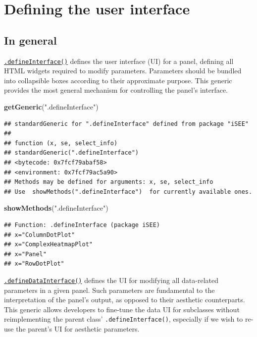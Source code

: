 \documentclass[
]{book}
\newenvironment{Shaded}{\begin{snugshade}}{\end{snugshade}}
\newcommand{\KeywordTok}[1]{\textcolor[rgb]{0.13,0.29,0.53}{\textbf{#1}}}
\newcommand{\NormalTok}[1]{#1}
\newcommand{\StringTok}[1]{\textcolor[rgb]{0.31,0.60,0.02}{#1}}
\begin{document}
\hypertarget{defining-the-user-interface}{%
\section{Defining the user interface}\label{defining-the-user-interface}}

\hypertarget{in-general}{%
\subsection{In general}\label{in-general}}

\href{https://isee.github.io/iSEE/reference/interface-generics.html}{\texttt{.defineInterface()}} defines the user interface (UI) for a panel, defining all HTML widgets required to modify parameters.
Parameters should be bundled into collapsible boxes according to their approximate purpose.
This generic provides the most general mechanism for controlling the panel's interface.

\begin{Shaded}
\begin{Highlighting}[]
\KeywordTok{getGeneric}\NormalTok{(}\StringTok{".defineInterface"}\NormalTok{)}
\end{Highlighting}
\end{Shaded}

\begin{verbatim}
## standardGeneric for ".defineInterface" defined from package "iSEE"
## 
## function (x, se, select_info) 
## standardGeneric(".defineInterface")
## <bytecode: 0x7fcf79abaf58>
## <environment: 0x7fcf79ac5a90>
## Methods may be defined for arguments: x, se, select_info
## Use  showMethods(".defineInterface")  for currently available ones.
\end{verbatim}

\begin{Shaded}
\begin{Highlighting}[]
\KeywordTok{showMethods}\NormalTok{(}\StringTok{".defineInterface"}\NormalTok{)}
\end{Highlighting}
\end{Shaded}

\begin{verbatim}
## Function: .defineInterface (package iSEE)
## x="ColumnDotPlot"
## x="ComplexHeatmapPlot"
## x="Panel"
## x="RowDotPlot"
\end{verbatim}

\href{https://isee.github.io/iSEE/reference/interface-generics.html}{\texttt{.defineDataInterface()}} defines the UI for modifying all data-related parameters in a given panel.
Such parameters are fundamental to the interpretation of the panel's output, as opposed to their aesthetic counterparts.
This generic allows developers to fine-tune the data UI for subclasses without reimplementing the parent class' \texttt{.defineInterface()}, especially if we wish to re-use the parent's UI for aesthetic parameters.
\end{document}
